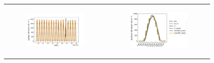 \begin{figure}[hbtp]
    \centering
    \begin{tabular}{cc}
        \begin{subfigure}[t]{0.5\textwidth}
            \caption{}
            \includegraphics[width=\textwidth]{images/chap6/SOP_TS_DC/time_series_cendrosa_SWdnSFC.png}
        \end{subfigure} &
        \begin{subfigure}[t]{0.5\textwidth}
            \caption{}
            \includegraphics[width=\textwidth]{images/chap6/SOP_TS_DC/diurnal_cycle_cendrosa_SWdnSFC.png}
        \end{subfigure} \\
        

\end{tabular}
\end{figure}
